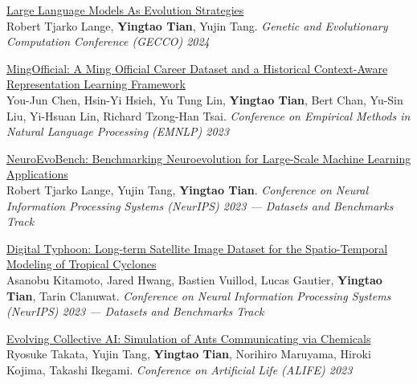 \documentclass[line,margin]{cv}
\begin{document}
\begin{resume}
{  \begin{samepage}
  \href{https://arxiv.org/abs/2402.18381}{Large Language Models As Evolution Strategies}\\
  Robert Tjarko Lange, \textbf{Yingtao Tian}, Yujin Tang. \emph{Genetic and Evolutionary Computation Conference (GECCO) 2024}
  \par\end{samepage}

  \begin{samepage}
  \href{https://aclanthology.org/2023.emnlp-main.266/}{MingOfficial: A Ming Official Career Dataset and a Historical Context-Aware Representation Learning Framework}\\
  You-Jun Chen, Hsin-Yi Hsieh, Yu Tung Lin, \textbf{Yingtao Tian}, Bert Chan, Yu-Sin Liu, Yi-Hsuan Lin, Richard Tzong-Han Tsai. \emph{Conference on Empirical Methods in Natural Language Processing (EMNLP) 2023}
  \par\end{samepage}

  \begin{samepage}
  \href{https://openreview.net/forum?id=s6qtLyR6uJ}{NeuroEvoBench: Benchmarking Neuroevolution for Large-Scale Machine Learning Applications}\\
  Robert Tjarko Lange, Yujin Tang, \textbf{Yingtao Tian}. \emph{Conference on Neural Information Processing Systems (NeurIPS) 2023 --- Datasets and Benchmarks Track}
  \par\end{samepage}

  \begin{samepage}
  \href{https://arxiv.org/abs/2311.02665}{Digital Typhoon: Long-term Satellite Image Dataset for the Spatio-Temporal Modeling of Tropical Cyclones}\\
  Asanobu Kitamoto, Jared Hwang, Bastien Vuillod, Lucas Gautier, \textbf{Yingtao Tian}, Tarin Clanuwat. \emph{Conference on Neural Information Processing Systems (NeurIPS) 2023 --- Datasets and Benchmarks Track}
  \par\end{samepage}

  \begin{samepage}
  \href{https://direct.mit.edu/isal/proceedings-pdf/isal/35/112/2149148/isal\_a\_00676.pdf}{Evolving Collective AI: Simulation of Ants Communicating via Chemicals}\\
  Ryosuke Takata, Yujin Tang, \textbf{Yingtao Tian}, Norihiro Maruyama, Hiroki Kojima, Takashi Ikegami. \emph{Conference on Artificial Life (ALIFE) 2023}
  \par\end{samepage}

}
\end{resume}
\end{document}

